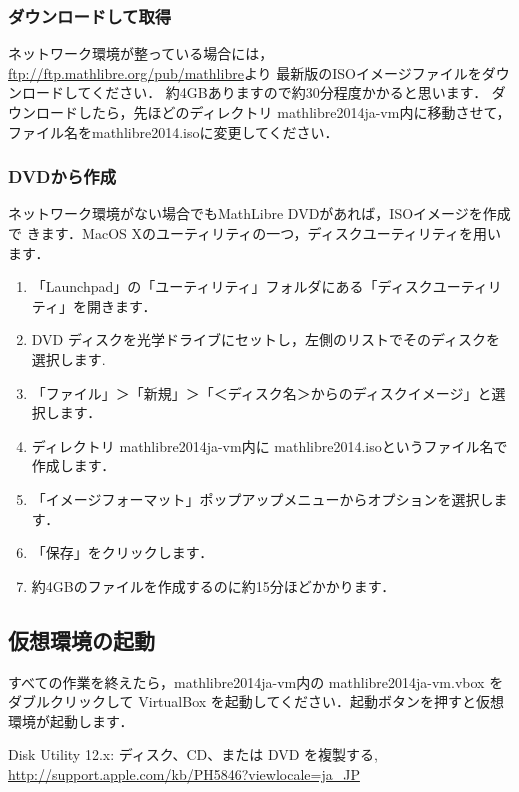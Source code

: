 \documentclass[a4j]{jsarticle}
\newcommand{\vm}{mathlibre2014ja-vm}
\begin{document}
\subsubsection{ダウンロードして取得}
ネットワーク環境が整っている場合には，
\url{ftp://ftp.mathlibre.org/pub/mathlibre}より
最新版のISOイメージファイルをダウンロードしてください．
約4GBありますので約30分程度かかると思います．
ダウンロードしたら，先ほどのディレクトリ \vm 内に移動させて，ファイル名をmathlibre2014.isoに変更してください．

\subsubsection{DVDから作成}
ネットワーク環境がない場合でもMathLibre DVDがあれば，ISOイメージを作成で
きます．MacOS Xのユーティリティの一つ，ディスクユーティリティを用います． 
\begin{enumerate}
 \item 「Launchpad」の「ユーティリティ」フォルダにある「ディスクユーティリティ」を開きます．
 \item DVD ディスクを光学ドライブにセットし，左側のリストでそのディスクを選択します.
 \item 「ファイル」＞「新規」＞「＜ディスク名＞からのディスクイメージ」と選択します．
 \item ディレクトリ \vm 内に mathlibre2014.isoというファイル名で作成します．
 \item 「イメージフォーマット」ポップアップメニューからオプションを選択します． 
 \item 「保存」をクリックします．
 \item 約4GBのファイルを作成するのに約15分ほどかかります．
\end{enumerate}

\subsection{仮想環境の起動}
すべての作業を終えたら，\vm 内の \vm.vbox をダブルクリックして
VirtualBox を起動してください．起動ボタンを押すと仮想環境が起動します．

\begin{thebibliography}{9}
  Disk Utility 12.x: ディスク、CD、または DVD を複製する, \url{http://support.apple.com/kb/PH5846?viewlocale=ja_JP}
\end{thebibliography}
\end{document}
